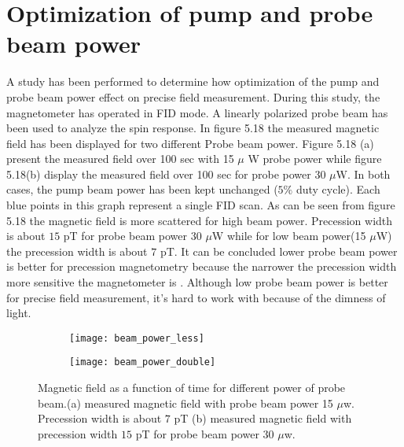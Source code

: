 \documentclass[12pt]{report}
\begin{document}
   \section{Optimization of pump and probe beam power} 
 A study has been performed to determine how optimization of the pump and probe beam power effect on precise field measurement.  During this study, the magnetometer has operated in FID mode.  A  linearly polarized probe beam has been used to analyze the spin response. In figure 5.18 the measured magnetic field has been displayed for two different  Probe beam power. Figure 5.18 (a) present the measured field over 100 sec with 15 $\mu$ W probe power while figure 5.18(b) display the measured field over 100 sec for probe power 30 $\mu$W. In both cases, the pump beam power has been kept unchanged ($5\%$ duty cycle). Each blue points in this graph represent a single FID scan. As can be seen from figure 5.18 the magnetic field is more scattered for high beam power. Precession width is about $15$ pT for probe beam power 30 $\mu$W while for low beam power(15 $\mu$W) the precession width is about $7$ pT. It can be concluded lower probe beam power is better for precession  magnetometry because the narrower the precession width more sensitive the magnetometer is . Although low probe beam power is better for precise field measurement, it's hard to work with because of the dimness of light.\\
  \begin{figure}
    \centering
 
    \begin{subfigure}[b]{0.45\textwidth}
        \centering
        \texttt{[image: beam\_power\_less]}
        \caption{}
        \label{fig:three sin x}
    \end{subfigure}
    \hfill
    \begin{subfigure}[b]{0.45\textwidth}
        \centering
        \texttt{[image: beam\_power\_double]}
        \caption{}
        \label{fig:five over x}
    \end{subfigure}
    \caption{ Magnetic field as a function of time for different power of probe beam.(a) measured magnetic field with probe beam power 15 $\mu$w. Precession width is about $7$ pT (b) measured magnetic field with precession width $15$ pT for probe beam power 30 $\mu$w.}
    \label{fig:three graphs}
\end{figure}
\end{document}
